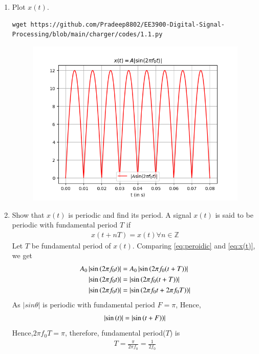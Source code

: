 \documentclass[journal,12pt,twocolumn]{IEEEtran}
\renewcommand\thesection{\arabic{section}}
\begin{document}
    \begin{enumerate}[label=\thesection.\arabic*
    ,ref=\thesection.\theenumi]
    \item Plot $x(t)$.\\
    \solution 
    \begin{lstlisting}
wget https://github.com/Pradeep8802/EE3900-Digital-Signal-Processing/blob/main/charger/codes/1.1.py
    \end{lstlisting}
    \begin{figure}[!ht]
			\centering
			\includegraphics[width=\columnwidth]{./figs/1.1.png}
			\caption{}
\end{figure}
    \item Show that $x(t)$ is periodic and find its period.
    \solution 
    A signal $x(t)$ is said to be periodic with fundamental period $T$ if
    \begin{align}
    \label{eq:peroidic}
    x(t+nT)=x(t) \forall n \in \mathbb{Z}
    \end{align}
Let $T$ be fundamental period of $x(t)$. Comparing \eqref{eq:peroidic} and \eqref{eq:x(t)}, we get
	\begin{align}
A_0\left\vert\sin\left(2\pi f_0 t\right)\right\vert&=A_0\left\vert\sin\left(2\pi f_0 (t+T)\right)\right\vert\\
\left\vert\sin\left(2\pi f_0 t\right)\right\vert&=\left\vert\sin\left(2\pi f_0 (t+T)\right)\right\vert\\
\left\vert\sin\left(2\pi f_0 t\right)\right\vert&=\left\vert\sin\left(2\pi f_0 t+2\pi f_0 T)\right)\right\vert
	\end{align}
As $|sin\theta|$ is periodic with fundamental period $F=\pi$, Hence,
    \begin{align}
\left\vert\sin\left(t\right)\right\vert=\left\vert\sin\left(t+F)\right)\right\vert
\end{align}
Hence,$2\pi f_0  T=\pi$, therefore, fundamental period($T$) is 
\begin{align}
\label{eq:ftp}
T=\frac{\pi}{2 \pi f_0}=\frac{1}{2f_0}
    \end{align}
    \end{enumerate}
\end{document}
